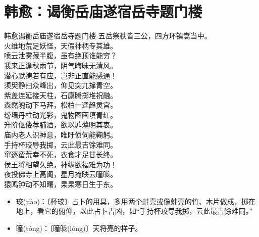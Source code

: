 \documentclass[12pt,oneside,a5paper]{book}
\begin{document}
\chapter{韩愈：谒衡岳庙遂宿岳寺题门楼}
\begin{poemzh}{韩愈}{谒衡岳庙遂宿岳寺题门楼}
五岳祭秩皆三公，四方环镇嵩当中。\\
火维地荒足妖怪，天假神柄专其雄。\\
喷云泄雾藏半腹，虽有绝顶谁能穷？\\
我来正逢秋雨节，阴气晦昧无清风。\\
潜心默祷若有应，岂非正直能感通！\\
须臾静扫众峰出，仰见突兀撑青空。\\
紫盖连延接天柱，石廪腾掷堆祝融。\\
森然魄动下马拜，松柏一迳趋灵宫。\\
纷墙丹柱动光彩，鬼物图画填青红。\\
升阶伛偻荐脯酒，欲以菲薄明其衷。\\
庙内老人识神意，睢盱侦伺能鞠躬。\\
手持杯珓导我掷，云此最吉馀难同。\\
窜逐蛮荒幸不死，衣食才足甘长终。\\
侯王将相望久绝，神纵欲福难为功！\\
夜投佛寺上高阁，星月掩映云曈昽。\\
猿鸣钟动不知曙，杲杲寒日生于东。\\ 
\end{poemzh}

\begin{itemize}
\item 珓(jiào)：〔杯珓〕占卜的用具，多用两个蚌壳或像蚌壳的竹、木片做成，掷在地上，看它的俯仰，以此占卜吉凶，如“手持杯珓导我掷，云此最吉馀难同。”
\item 曈(tóng)：〔曈昽(lóng)〕天将亮的样子。
\end{itemize}
\end{document}
